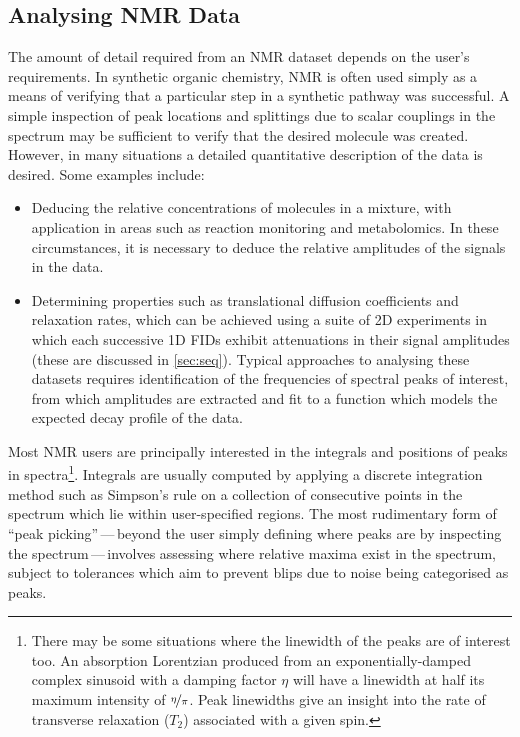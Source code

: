 \subsection{Analysing NMR Data}
\label{subsec:estimation-techniques}
The amount of detail required from an \ac{NMR} dataset depends on
the user's requirements. In synthetic organic chemistry, \ac{NMR} is often used
simply as a means of verifying that a particular step in a synthetic pathway
was successful. A simple inspection of peak locations and splittings due to
scalar couplings in the spectrum may be sufficient to verify that the desired
molecule was created. However, in many situations a detailed quantitative
description of the data is desired. Some examples include:
\begin{itemize}
    \item Deducing the relative concentrations of molecules in a mixture,
        with application in areas such as reaction
        monitoring\cite{Bernstein2016} and metabolomics\cite{Emwas2019}.
        In these circumstances, it is necessary to deduce the relative
        amplitudes of the signals in the data.
    \item Determining properties such as translational diffusion coefficients
        and relaxation rates, which can be achieved using a suite of \ac{2D}
        experiments in which each successive \ac{1D} \acp{FID} exhibit
        attenuations in their signal amplitudes (these are discussed in
        \cref{sec:seq}).  Typical approaches to analysing these datasets
        requires identification of the frequencies of spectral peaks of
        interest, from which amplitudes are extracted and fit to a
        function which models the expected decay profile of the data.
\end{itemize}

Most \ac{NMR} users are principally interested in the integrals and positions
of peaks in spectra\footnote{
    There may be some situations where the linewidth of the peaks are of
    interest too. An absorption Lorentzian produced from an
    exponentially-damped complex sinusoid with a damping factor $\eta$ will
    have a linewidth at half its maximum intensity of $\nicefrac{\eta}{\pi}$.
    Peak linewidths give an insight into the rate of transverse
    relaxation ($T_2$) associated with a given spin.
}.
Integrals are usually computed by applying a discrete integration method such
as Simpson's rule on a collection of consecutive points in the spectrum which
lie within user-specified regions.
The most rudimentary form of ``peak picking''\,---\,beyond the user
simply defining where peaks are by inspecting the spectrum\,---\,involves
assessing where relative maxima exist in the spectrum, subject to
tolerances which aim to prevent blips due to noise being categorised as
peaks.

